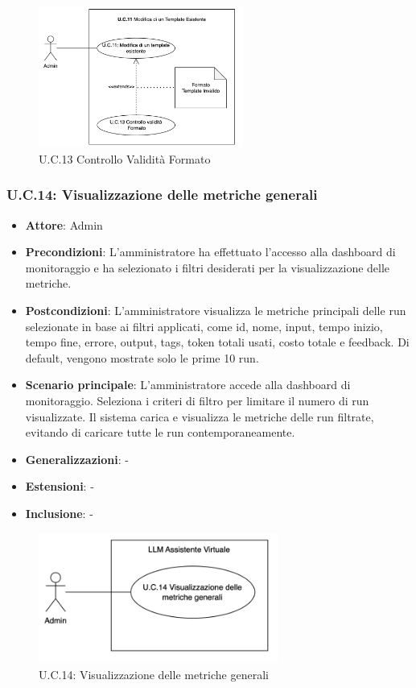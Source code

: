 \begin{figure}[H]
    \centering
    \includegraphics[width=0.6\textwidth]{img/UC13.2.png}
    \caption{U.C.13 Controllo Validità Formato}
\end{figure}
\newpage

\subsubsection{U.C.14: Visualizzazione delle metriche generali}
\begin{itemize}
    \item \textbf{Attore}: Admin
    \item \textbf{Precondizioni}: L'amministratore ha effettuato l'accesso alla dashboard di monitoraggio e 
    ha selezionato i filtri desiderati per la visualizzazione delle metriche.
    \item \textbf{Postcondizioni}: L'amministratore visualizza le metriche principali delle run selezionate in base ai filtri applicati, 
    come id, nome, input, tempo inizio, tempo fine, errore, output, tags, token totali usati, costo totale e feedback. Di default, 
    vengono mostrate solo le prime 10 run.
    \item \textbf{Scenario principale}: L'amministratore accede alla dashboard di monitoraggio.
    Seleziona i criteri di filtro per limitare il numero di run visualizzate. 
    Il sistema carica e visualizza le metriche delle run filtrate, evitando di caricare tutte le run contemporaneamente.
    \item \textbf{Generalizzazioni}: -
    \item \textbf{Estensioni}: -
    \item \textbf{Inclusione}: -
\end{itemize}
\begin{figure}[H]
    \centering
    \includegraphics[width=0.7\textwidth]{img/UC14.png}
    \caption{U.C.14: Visualizzazione delle metriche generali}
\end{figure}
\newpage



